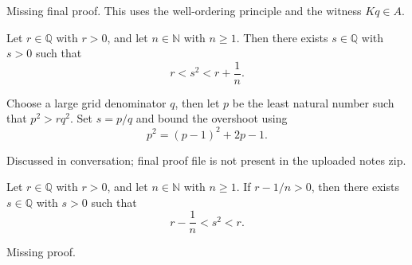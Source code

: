 \begin{remark*}[Status]
Missing final proof. This uses the well-ordering principle and the witness $Kq\in A$.
\end{remark*}

\begin{tcolorbox}[colback=thmbox, colframe=thmborder, arc=2pt,
  left=6pt, right=6pt, top=4pt, bottom=4pt,
  title={\small\textbf{Theorem (Rational Square Approximation from Above)}},
  fonttitle=\small\bfseries]
\begin{theorem}
\label{thm:rational-square-approximation-from-above}
Let $r\in\mathbb{Q}$ with $r>0$, and let $n\in\mathbb{N}$ with $n\ge 1$. Then there exists $s\in\mathbb{Q}$ with $s>0$ such that
\[
r<s^2<r+\frac1n.
\]
\end{theorem}
\end{tcolorbox}

\begin{remark*}
Choose a large grid denominator $q$, then let $p$ be the least natural number such that $p^2>rq^2$.  Set $s=p/q$ and bound the overshoot using
\[
p^2=(p-1)^2+2p-1.
\]
\end{remark*}

\begin{remark*}[Status]
Discussed in conversation; final proof file is not present in the uploaded notes zip.
\end{remark*}

\begin{tcolorbox}[colback=thmbox, colframe=thmborder, arc=2pt,
  left=6pt, right=6pt, top=4pt, bottom=4pt,
  title={\small\textbf{Theorem (Rational Square Approximation from Below)}},
  fonttitle=\small\bfseries]
\begin{theorem}
\label{thm:rational-square-approximation-from-below}
Let $r\in\mathbb{Q}$ with $r>0$, and let $n\in\mathbb{N}$ with $n\ge 1$. If $r-1/n>0$, then there exists $s\in\mathbb{Q}$ with $s>0$ such that
\[
r-\frac1n<s^2<r.
\]
\end{theorem}
\end{tcolorbox}

\begin{remark*}[Status]
Missing proof.
\end{remark*}
